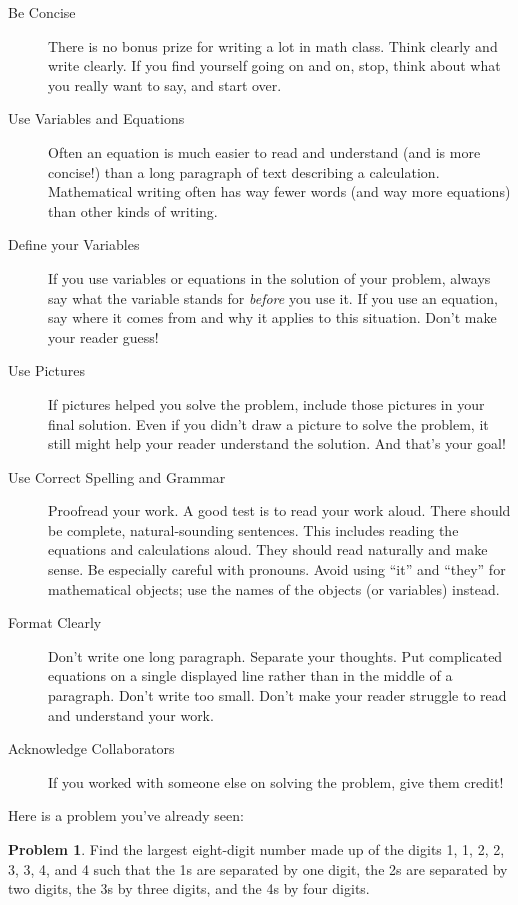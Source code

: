\documentclass[10pt, reqno]{amsart}
\theoremstyle{remark}
\theoremstyle{definition}
\newtheorem*{problem*}{Problem}
\numberwithin{equation}{section}  %
\begin{document}
\begin{description}
\item[Be Concise] There is no bonus prize for writing a lot in math class.  Think clearly and write clearly.  If you find yourself going on and on, stop, think about what you really want to say, and start over.


\item[Use Variables and Equations] Often an equation is much easier to read and understand (and is more concise!) than a long paragraph of text describing a calculation.  Mathematical writing often has way fewer words (and way more equations) than other kinds of writing.

\item[Define your Variables] If you use variables or equations in the solution of your problem, always say what the variable stands for \emph{before} you use it.  If you use an equation, say where it comes from and why it applies to this situation.  Don't make your reader guess!

\item[Use Pictures] If pictures helped you solve the problem, include those pictures in your final solution.  Even if you didn't draw a picture to solve the problem, it still might help your reader understand the solution.  And that's your goal!

\item[Use Correct Spelling and Grammar] Proofread your work.  A good test is to read your work aloud.  There should be complete, natural-sounding sentences.  This includes reading the equations and calculations aloud.  They should read naturally and make sense.   Be especially careful with pronouns.  Avoid using ``it'' and ``they'' for mathematical objects; use the names of the objects (or variables) instead.

\item[Format Clearly] Don't write one long paragraph.  Separate your thoughts.   Put complicated equations on a single displayed line rather than in the middle of a paragraph.  Don't write too small.  Don't make your reader struggle to read and understand your work.

\item[Acknowledge Collaborators] If you worked with someone else on solving the problem, give them credit!


\end{description}

Here is a problem you've already seen:
\begin{problem*}
Find the largest eight-digit number made up of the digits 1, 1, 2, 2, 3, 3, 4, and 4 such that the 1s are separated by one digit, the 2s are separated by two digits, the 3s by three digits, and the 4s by four digits.

\end{problem*}
\end{document}
